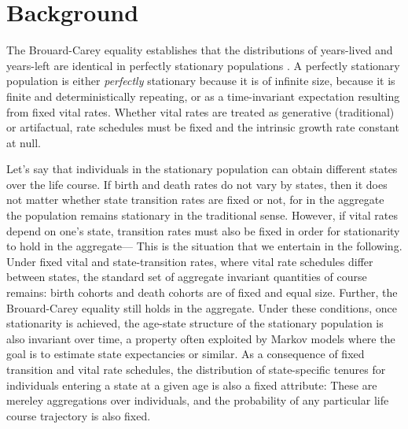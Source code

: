 \documentclass[12pt,oneside,a4paper]{article}
\theoremstyle{definition}
\begin{document}
\section{Background}
The Brouard-Carey equality establishes that the distributions of years-lived and years-left are identical in perfectly
stationary populations
\citep{brouard1989mouvements,Vaupel2009,rao2014,villavicencioRiffeSymmetires2016}.
A perfectly stationary population is either \emph{perfectly} stationary because it is
of infinite size, because it is finite and
deterministically repeating, or as a time-invariant expectation resulting from fixed vital rates. Whether vital rates are treated as generative (traditional) or artifactual, rate schedules must be fixed and the intrinsic growth rate constant at null.

Let's say that individuals in
the stationary population can obtain different states over the life course. If
birth and death rates do not vary by states, then it does not matter whether
state transition rates are fixed or not, for in the aggregate the population remains
stationary in the traditional sense. However, if vital rates depend on one's
state, transition rates must also be fixed in order for stationarity to
hold in the aggregate--- This is the situation that we entertain in the
following. Under fixed vital and state-transition rates, where vital rate
schedules differ between states, the standard set of aggregate invariant
quantities of course remains:
birth cohorts and death cohorts are of fixed and equal size. Further, the
Brouard-Carey equality still holds in the aggregate. Under these conditions,
once stationarity is achieved, the age-state structure of the stationary
population is also invariant over time, a property often exploited by Markov
models where the goal is to estimate state expectancies or similar. As a
consequence of fixed transition and vital rate schedules, the distribution of state-specific tenures for individuals entering a state at a given age is also a fixed attribute: These are mereley aggregations over individuals, and the probability of any particular life course trajectory is also fixed.
\end{document}
